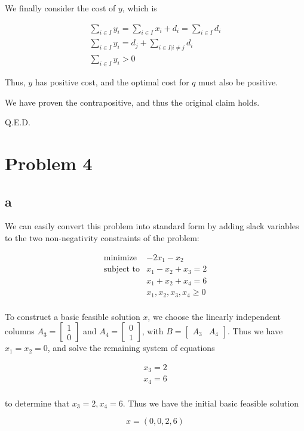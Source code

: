 \documentclass[11pt,a4paper]{article}
\begin{document}
We finally consider the cost of $y$, which is

\begin{equation}
\begin{split}
\sum_{i\in I} y_i =\sum_{i\in I} x_i+d_i=\sum_{i\in I}d_i\\
\sum_{i\in I} y_i = d_j +\sum_{i\in I|i\neq j}d_i\\
\sum_{i\in I} y_i > 0
\end{split}
\end{equation}

Thus, $y$ has positive cost, and the optimal cost for $q$ must also be positive.

We have proven the contrapositive, and thus the original claim holds.

Q.E.D.

\section{Problem 4}
\subsection{a}

We can easily convert this problem into standard form by adding slack variables to the two non-negativity constraints of the problem:

$$
\begin{array}{ll}
\text{minimize}  & -2x_1-x_2\\
\text{subject to}& x_1-x_2+x_3=2\\
                 & x_1+x_2+x_4=6\\
                 & x_1, x_2, x_3, x_4\geq 0\\
\end{array}
$$

To construct a basic feasible solution $x$, we choose the linearly independent columns $A_3=\begin{bmatrix}1\\0\end{bmatrix}$ and $A_4=\begin{bmatrix}0\\1\end{bmatrix}$, with $B=\begin{bmatrix}A_3 & A_4\end{bmatrix}$. Thus we have $x_1=x_2=0$, and solve the remaining system of equations

$$
\begin{array}{c}
x_3=2\\
x_4=6\\
\end{array}
$$

to determine that $x_3=2, x_4=6$. Thus we have the initial basic feasible solution

$$
x=(0,0,2,6)
$$
\end{document}
